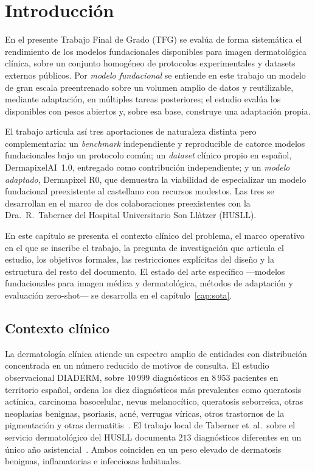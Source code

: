 
\chapter{Introducción}
\label{cap:intro}

En el presente Trabajo Final de Grado (TFG) se evalúa de forma
sistemática el rendimiento de los modelos fundacionales disponibles
para imagen dermatológica clínica, sobre un conjunto homogéneo de
protocolos experimentales y datasets externos públicos. Por
\emph{modelo fundacional} se entiende en este trabajo un modelo de
gran escala preentrenado sobre un volumen amplio de datos y
reutilizable, mediante adaptación, en múltiples tareas posteriores;
el estudio evalúa los disponibles con pesos abiertos y, sobre esa
base, construye una adaptación propia.

El trabajo articula así tres aportaciones de naturaleza distinta pero
complementaria: un \emph{benchmark} independiente y reproducible de
catorce modelos fundacionales bajo un protocolo común; un
\emph{dataset} clínico propio en español, DermapixelAI~1.0, entregado
como contribución independiente; y un \emph{modelo adaptado},
Dermapixel R0, que demuestra la viabilidad de especializar un modelo
fundacional preexistente al castellano con recursos modestos. Las tres
se desarrollan en el marco de dos colaboraciones preexistentes con la
Dra.~R.~Taberner del Hospital Universitario Son Llàtzer (HUSLL).

En este capítulo se presenta el contexto clínico del problema, el
marco operativo en el que se inscribe el trabajo, la pregunta de
investigación que articula el estudio, los objetivos formales, las
restricciones explícitas del diseño y la estructura del resto del
documento. El estado del arte específico ---modelos fundacionales
para imagen médica y dermatológica, métodos de adaptación y
evaluación zero-shot--- se desarrolla en el
capítulo~\ref{cap:sota}.


\section{Contexto clínico}
\label{sec:contexto}

La dermatología clínica atiende un espectro amplio de entidades con
distribución concentrada en un número reducido de motivos de
consulta. El estudio observacional DIADERM, sobre $10\,999$
diagnósticos en $8\,953$ pacientes en territorio español,
ordena los diez diagnósticos más prevalentes como queratosis
actínica, carcinoma basocelular, nevus melanocítico, queratosis
seborreica, otras neoplasias benignas, psoriasis, acné, verrugas
víricas, otros trastornos de la pigmentación y otras
dermatitis~\cite{diaderm2018}. El trabajo local de Taberner et~al.\
sobre el servicio dermatológico del HUSLL documenta $213$
diagnósticos diferentes en un único año
asistencial~\cite{taberner2010_motivos}. Ambos coinciden en un peso
elevado de dermatosis benignas, inflamatorias e infecciosas
habituales.


